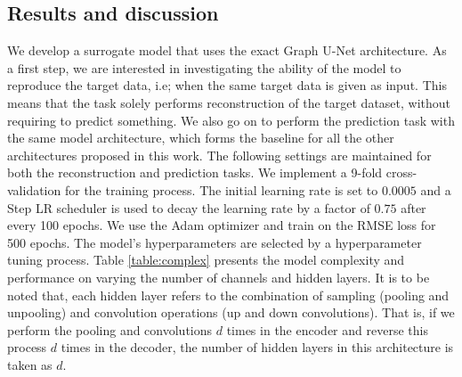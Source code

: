 \subsection{Results and discussion}
We develop a surrogate model that uses the exact Graph U-Net architecture. As a first step, we are interested in investigating the ability of the model to reproduce the target data, i.e; when the same target data is given as input. This means that the task solely performs reconstruction of the target dataset, without requiring to predict something. We also go on to perform the prediction task with the same model architecture, which forms the baseline for all the other architectures proposed in this work. The following settings are maintained for both the reconstruction and prediction tasks. We implement a 9-fold cross-validation for the training process. The initial learning rate is set to $0.0005$ and a Step LR scheduler is used to decay the learning rate by a factor of $0.75$ after every 100 epochs. We use the Adam optimizer and train on the RMSE loss for 500 epochs. The model's hyperparameters are selected by a hyperparameter tuning process. Table \ref{table:complex} presents the model complexity and performance on varying the number of channels and hidden layers. It is to be noted that, each hidden layer refers to the combination of sampling (pooling and unpooling) and convolution operations (up and down convolutions). That is, if we perform the pooling and convolutions $d$ times in the encoder and reverse this process $d$ times in the decoder, the number of hidden layers in this architecture is taken as $d$. \\
